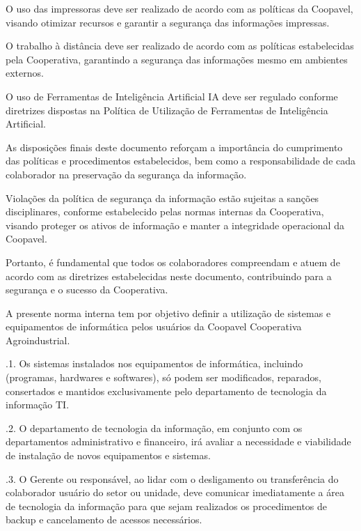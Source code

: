 \documentclass[a4paper,10pt,portuges]{sphinxmanual}
\begin{document}
\sphinxAtStartPar
O uso das impressoras deve ser realizado de acordo com as políticas da Coopavel,
visando otimizar recursos e garantir a segurança das informações impressas.

\sphinxAtStartPar
O trabalho à distância deve ser realizado de acordo com as políticas estabelecidas pela
Cooperativa, garantindo a segurança das informações mesmo em ambientes externos.

\sphinxAtStartPar
O uso de Ferramentas de Inteligência Artificial \sphinxhyphen{} IA deve ser regulado conforme diretrizes
dispostas na Política de Utilização de Ferramentas de Inteligência Artificial.

\sphinxAtStartPar
As disposições finais deste documento reforçam a importância do cumprimento das
políticas e procedimentos estabelecidos, bem como a responsabilidade de cada
colaborador na preservação da segurança da informação.

\sphinxAtStartPar
Violações da política de segurança da informação estão sujeitas a sanções disciplinares,
conforme estabelecido pelas normas internas da Cooperativa, visando proteger os ativos
de informação e manter a integridade operacional da Coopavel.

\sphinxAtStartPar
Portanto, é fundamental que todos os colaboradores compreendam e atuem de acordo com
as diretrizes estabelecidas neste documento, contribuindo para a segurança e o sucesso da
Cooperativa.

\sphinxAtStartPar
A presente norma interna tem por objetivo definir a utilização de sistemas e equipamentos
de informática pelos usuários da Coopavel Cooperativa Agroindustrial.

.1. Os sistemas instalados nos equipamentos de informática, incluindo (programas,
hardwares e softwares), só podem ser modificados, reparados, consertados e mantidos
exclusivamente pelo departamento de tecnologia da informação \sphinxhyphen{} TI.

.2. O departamento de tecnologia da informação, em conjunto com os departamentos
administrativo e financeiro, irá avaliar a necessidade e viabilidade de instalação de novos
equipamentos e sistemas.

.3. O Gerente ou responsável, ao lidar com o desligamento ou transferência do
colaborador usuário do setor ou unidade, deve comunicar imediatamente a área de
tecnologia da informação para que sejam realizados os procedimentos de backup e
cancelamento de acessos necessários.
\end{document}
